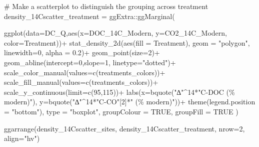 \documentclass[
  letterpaper,
  DIV=11,
  numbers=noendperiod]{scrartcl}
\newenvironment{Shaded}{\begin{snugshade}}{\end{snugshade}}
\newcommand{\AttributeTok}[1]{\textcolor[rgb]{0.40,0.45,0.13}{#1}}
\newcommand{\CommentTok}[1]{\textcolor[rgb]{0.37,0.37,0.37}{#1}}
\newcommand{\ConstantTok}[1]{\textcolor[rgb]{0.56,0.35,0.01}{#1}}
\newcommand{\DecValTok}[1]{\textcolor[rgb]{0.68,0.00,0.00}{#1}}
\newcommand{\FloatTok}[1]{\textcolor[rgb]{0.68,0.00,0.00}{#1}}
\newcommand{\FunctionTok}[1]{\textcolor[rgb]{0.28,0.35,0.67}{#1}}
\newcommand{\NormalTok}[1]{\textcolor[rgb]{0.00,0.23,0.31}{#1}}
\newcommand{\OtherTok}[1]{\textcolor[rgb]{0.00,0.23,0.31}{#1}}
\newcommand{\SpecialCharTok}[1]{\textcolor[rgb]{0.37,0.37,0.37}{#1}}
\newcommand{\StringTok}[1]{\textcolor[rgb]{0.13,0.47,0.30}{#1}}
\begin{document}
\begin{Shaded}
\begin{Highlighting}[]
\CommentTok{\# Make a scatterplot to distinguish the grouping across treatment}
\NormalTok{density\_14Cscatter\_treatment }\OtherTok{=} 
\NormalTok{ggExtra}\SpecialCharTok{::}\FunctionTok{ggMarginal}\NormalTok{(}
  
            \FunctionTok{ggplot}\NormalTok{(}\AttributeTok{data=}\NormalTok{DC\_Q,}\FunctionTok{aes}\NormalTok{(}\AttributeTok{x=}\NormalTok{DOC\_14C\_Modern, }\AttributeTok{y=}\NormalTok{CO2\_14C\_Modern, }
                    \AttributeTok{color=}\NormalTok{Treatment))}\SpecialCharTok{+}
               \FunctionTok{stat\_density\_2d}\NormalTok{(}\FunctionTok{aes}\NormalTok{(}\AttributeTok{fill =}\NormalTok{ Treatment), }\AttributeTok{geom =} \StringTok{"polygon"}\NormalTok{, }\AttributeTok{linewidth=}\DecValTok{0}\NormalTok{,}
                             \AttributeTok{alpha =} \FloatTok{0.2}\NormalTok{)}\SpecialCharTok{+} 
            \FunctionTok{geom\_point}\NormalTok{(}\AttributeTok{size=}\DecValTok{2}\NormalTok{)}\SpecialCharTok{+}
            \FunctionTok{geom\_abline}\NormalTok{(}\AttributeTok{intercept=}\DecValTok{0}\NormalTok{,}\AttributeTok{slope=}\DecValTok{1}\NormalTok{, }\AttributeTok{linetype=}\StringTok{"dotted"}\NormalTok{)}\SpecialCharTok{+}
            \FunctionTok{scale\_color\_manual}\NormalTok{(}\AttributeTok{values=}\FunctionTok{c}\NormalTok{(treatments\_colors))}\SpecialCharTok{+}
            \FunctionTok{scale\_fill\_manual}\NormalTok{(}\AttributeTok{values=}\FunctionTok{c}\NormalTok{(treatments\_colors))}\SpecialCharTok{+}
            \FunctionTok{scale\_y\_continuous}\NormalTok{(}\AttributeTok{limit=}\FunctionTok{c}\NormalTok{(}\DecValTok{95}\NormalTok{,}\DecValTok{115}\NormalTok{))}\SpecialCharTok{+}
            \FunctionTok{labs}\NormalTok{(}\AttributeTok{x=}\FunctionTok{bquote}\NormalTok{(}\StringTok{"∆"}\SpecialCharTok{\^{}}\DecValTok{14}\SpecialCharTok{*}\StringTok{"C{-}DOC (\% modern)"}\NormalTok{), }
                   \AttributeTok{y=}\FunctionTok{bquote}\NormalTok{(}\StringTok{"∆"}\SpecialCharTok{\^{}}\DecValTok{14}\SpecialCharTok{*}\StringTok{"C{-}CO"}\NormalTok{[}\DecValTok{2}\NormalTok{]}\SpecialCharTok{*}\StringTok{" (\% modern)"}\NormalTok{))}\SpecialCharTok{+}
              \FunctionTok{theme}\NormalTok{(}\AttributeTok{legend.position =} \StringTok{"bottom"}\NormalTok{), }
            \AttributeTok{type =} \StringTok{"boxplot"}\NormalTok{, }\AttributeTok{groupColour =} \ConstantTok{TRUE}\NormalTok{, }\AttributeTok{groupFill =} \ConstantTok{TRUE}\NormalTok{ )}
            


\FunctionTok{ggarrange}\NormalTok{(density\_14Cscatter\_sites,}
\NormalTok{density\_14Cscatter\_treatment, }\AttributeTok{nrow=}\DecValTok{2}\NormalTok{, }\AttributeTok{align=}\StringTok{"hv"}\NormalTok{)}
\end{Highlighting}
\end{Shaded}
\end{document}
